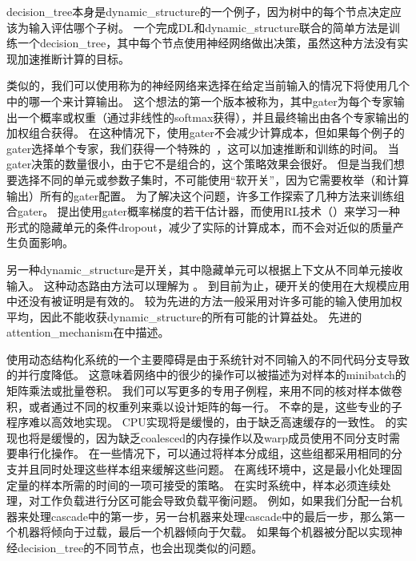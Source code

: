 \gls{decision_tree}本身是\gls{dynamic_structure}的一个例子，因为树中的每个节点决定应该为输入评估哪个子树。
一个完成\gls{DL}和\gls{dynamic_structure}联合的简单方法是训练一个\gls{decision_tree}，其中每个节点使用神经网络做出决策\citep{guo1992classification}，虽然这种方法没有实现加速推断计算的目标。



类似的，我们可以使用称为的神经网络来选择在给定当前输入的情况下将使用几个中的哪一个来计算输出。
这个想法的第一个版本被称为\citep{Nowlan90,Jacobs-nc91}，其中\gls{gater}为每个专家输出一个概率或权重（通过非线性的\gls{softmax}获得），并且最终输出由各个专家输出的加权组合获得。
在这种情况下，使用\gls{gater}不会减少计算成本，但如果每个例子的\gls{gater}选择单个专家，我们获得一个特殊的~\citep{collobert:2001:rr01-12,collobert:2002}，这可以加速推断和训练的时间。
当\gls{gater}决策的数量很小，由于它不是组合的，这个策略效果会很好。
但是当我们想要选择不同的单元或参数子集时，不可能使用``软开关''，因为它需要枚举（和计算输出）所有的\gls{gater}配置。
为了解决这个问题，许多工作探索了几种方法来训练组合\gls{gater}。
\citet{bengio-arxiv13-condcomp}提出使用\gls{gater}概率梯度的若干估计器，而\citet{Bacon-et-al-RLDM2015,BengioE-et-al-arXiv2015}使用\gls{RL}技术（）来学习一种形式的隐藏单元的条件\gls{dropout}，减少了实际的计算成本，而不会对近似的质量产生负面影响。


另一种\gls{dynamic_structure}是开关，其中隐藏单元可以根据上下文从不同单元接收输入。
这种动态路由方法可以理解为 \citep{Olshausen1993}。
到目前为止，硬开关的使用在大规模应用中还没有被证明是有效的。
较为先进的方法一般采用对许多可能的输入使用加权平均，因此不能收获\gls{dynamic_structure}的所有可能的计算益处。
先进的\gls{attention_mechanism}在中描述。



使用动态结构化系统的一个主要障碍是由于系统针对不同输入的不同代码分支导致的并行度降低。
这意味着网络中的很少的操作可以被描述为对样本的\gls{minibatch}的矩阵乘法或批量卷积。
我们可以写更多的专用子例程，来用不同的核对样本做卷积，或者通过不同的权重列来乘以设计矩阵的每一行。
不幸的是，这些专业的子程序难以高效地实现。
CPU实现将是缓慢的，由于缺乏高速缓存的一致性。
的实现也将是缓慢的，因为缺乏\gls{coalesced}的内存操作以及\gls{warp}成员使用不同分支时需要串行化操作。
在一些情况下，可以通过将样本分成组，这些组都采用相同的分支并且同时处理这些样本组来缓解这些问题。
在离线环境中，这是最小化处理固定量的样本所需的时间的一项可接受的策略。
在实时系统中，样本必须连续处理，对工作负载进行分区可能会导致负载平衡问题。
例如，如果我们分配一台机器来处理\gls{cascade}中的第一步，另一台机器来处理\gls{cascade}中的最后一步，那么第一个机器将倾向于过载，最后一个机器倾向于欠载。
如果每个机器被分配以实现神经\gls{decision_tree}的不同节点，也会出现类似的问题。


